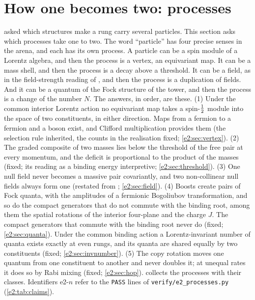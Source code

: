 \section{How one becomes two: processes}
\label{e2:sec:main}

 asked which structures make a rung carry several particles. This section asks which processes take one to two. The word
``particle'' has four precise senses in the arena, and each has its own process. A particle can be a spin module of a Lorentz algebra, and
then the process is a vertex, an equivariant map. It can be a mass shell, and then the process is a decay above a threshold. It can be a
field, as in the field-strength reading of \cite{RE}, and then the process is a duplication of fields. And it can be a quantum of the Fock
structure of the tower, and then the process is a change of the number $N$. The answers, in order, are these.
(1) Under the common interior Lorentz action no equivariant map takes a spin-$\tfrac12$ module into the space of two constituents, in either
direction. Maps from a fermion to a fermion and a boson exist, and Clifford multiplication provides them (the selection rule inherited, the
counts in the realisation fixed; \cref{e2:sec:vertex}). (2) The graded composite of two masses lies below the threshold of the free pair at every
momentum, and the deficit is proportional to the product of the masses (fixed; its reading as a binding energy interpretive;
\cref{e2:sec:threshold}). (3) One null field never becomes a massive pair covariantly, and two non-collinear null fields always form one
(restated from \cite{RE}; \cref{e2:sec:field}). (4) Boosts create pairs of Fock quanta, with the amplitudes of a fermionic Bogoliubov
transformation, and so do the compact generators that do not commute with the binding root, among them the spatial rotations of the interior
four-plane and the charge $J$. The compact generators that commute with the binding root never do (fixed; \cref{e2:sec:quanta}). Under the
common binding action a Lorentz-invariant number of quanta exists exactly at even rungs, and its quanta are shared equally by two constituents
(fixed; \cref{e2:sec:invnumber}). (5) The copy rotation moves one quantum from one constituent to another and never doubles it; at unequal
rates it does so by Rabi mixing (fixed; \cref{e2:sec:hop}).  collects the processes with their classes. Identifiers
e2-$n$ refer to the \texttt{PASS} lines of \texttt{verify/e2\_processes.py} (\cref{e2:tab:claims}).

